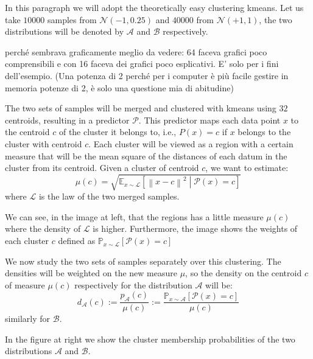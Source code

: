 \begin{exempli_gratia}
	In this paragraph we will adopt the theoretically easy clustering \gls{kmeans}. Let us take $\num{10000}$ samples from $\mathcal{N}(-1,0.25)$ and $\num{40000}$ from $\mathcal{N}(+1,1)$, the two distributions will be denoted by $\mathcal{A}$ and $\mathcal{B}$ respectively.

	\begin{note}
		 perché sembrava graficamente meglio da vedere: 64 faceva grafici poco comprensibili e con 16 faceva dei grafici poco esplicativi. E' solo per i fini dell'esempio. (Una potenza di 2 perché per i computer è più facile gestire in memoria potenze di 2, è solo una questione mia di abitudine)
	\end{note}

	\begin{modified}
	\noindent The two sets of samples will be merged and clustered with \gls{kmeans} using $32$ centroids, resulting in a predictor $\mathcal{P}$. This predictor maps each data point $x$ to the centroid $c$ of the cluster it belongs to, i.e., $P(x)=c$ if $x$ belongs to the cluster with centroid $c$. Each cluster will be viewed as a region with a certain measure that will be the mean square of the distances of each datum in the cluster from its centroid. Given a cluster of centroid $c$, we want to estimate:
	\[
	\mu(c)=\sqrt{\mathbb{E}_{x\sim\mathcal{L}}\left[\left\|x-c\right\|^2\middle|\mathcal{P}\left(x\right)=c\right]}
	\]
	where $\mathcal{L}$ is the law of the two merged samples.

	\noindent We can see, in the image at left, that the regions has a little measure $\mu(c)$ where the density of $\mathcal{L}$ is higher. Furthermore, the image shows the weights of each cluster $c$ defined as  $\mathbb{P}_{x\sim\mathcal{L}}\left[\mathcal{P}(x)=c\right]$

	\noindent We now study the two sets of samples separately over this clustering. The densities will be weighted on the new measure $\mu$, so the density on the centroid $c$ of measure $\mu(c)$ respectively for the distribution $\mathcal{A}$ will be:
	\[
	d_\mathcal{A}(c):=\frac{p_\mathcal{A}(c)}{\mu(c)} := \frac{\mathbb{P}_{x\sim\mathcal{A}}\left[\mathcal{P}(x)=c\right]}{\mu(c)}
	\]
	similarly for $\mathcal{B}$.

	\noindent In the figure at right we show the cluster membership probabilities of the two distributions $\mathcal{A}$ and $\mathcal{B}$.


\end{modified}
\end{exempli_gratia}
